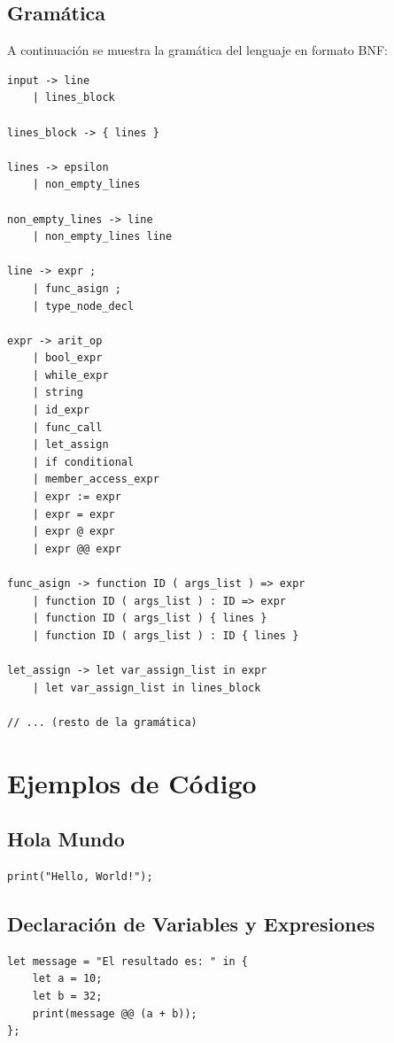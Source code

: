\documentclass{article}
\begin{document}
\subsection{Gramática}

A continuación se muestra la gramática del lenguaje en formato BNF:

\begin{verbatim}
input -> line
    | lines_block

lines_block -> { lines }

lines -> epsilon
    | non_empty_lines

non_empty_lines -> line
    | non_empty_lines line

line -> expr ;
    | func_asign ;
    | type_node_decl

expr -> arit_op
    | bool_expr
    | while_expr
    | string
    | id_expr
    | func_call
    | let_assign
    | if conditional
    | member_access_expr
    | expr := expr
    | expr = expr
    | expr @ expr
    | expr @@ expr

func_asign -> function ID ( args_list ) => expr
    | function ID ( args_list ) : ID => expr
    | function ID ( args_list ) { lines }
    | function ID ( args_list ) : ID { lines }

let_assign -> let var_assign_list in expr
    | let var_assign_list in lines_block

// ... (resto de la gramática)
\end{verbatim}

\section{Ejemplos de Código}

\subsection{Hola Mundo}
\begin{verbatim}
print("Hello, World!");
\end{verbatim}

\subsection{Declaración de Variables y Expresiones}
\begin{verbatim}
let message = "El resultado es: " in {
    let a = 10;
    let b = 32;
    print(message @@ (a + b));
};
\end{verbatim}
\end{document}
